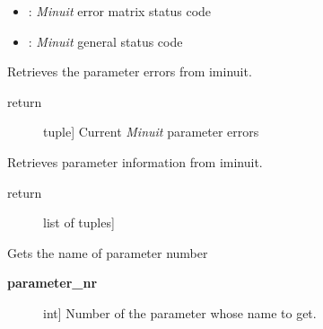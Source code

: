 \documentclass[a4paper,10pt,english]{sphinxmanual}
\begin{document}
\begin{fulllineitems}
\begin{fulllineitems}
\begin{description}
\begin{itemize}
\item {} 
: \emph{Minuit} error matrix status code

\item {} 
: \emph{Minuit} general status code

\end{itemize}

\end{description}

\end{fulllineitems}


\begin{fulllineitems}
\label{module_doc:kafe.iminuit_wrapper.IMinuit.get_parameter_errors}
Retrieves the parameter errors from iminuit.
\begin{description}
\item[{return}] \leavevmode{[}tuple{]}
Current \emph{Minuit} parameter errors

\end{description}

\end{fulllineitems}


\begin{fulllineitems}
\label{module_doc:kafe.iminuit_wrapper.IMinuit.get_parameter_info}
Retrieves parameter information from iminuit.
\begin{description}
\item[{return}] \leavevmode{[}list of tuples{]}

\end{description}

\end{fulllineitems}


\begin{fulllineitems}
\label{module_doc:kafe.iminuit_wrapper.IMinuit.get_parameter_name}
Gets the name of parameter number 
\begin{description}
\item[{\textbf{parameter\_nr}}] \leavevmode{[}int{]}
Number of the parameter whose name to get.


\end{description}
\end{fulllineitems}
\end{fulllineitems}
\end{document}
